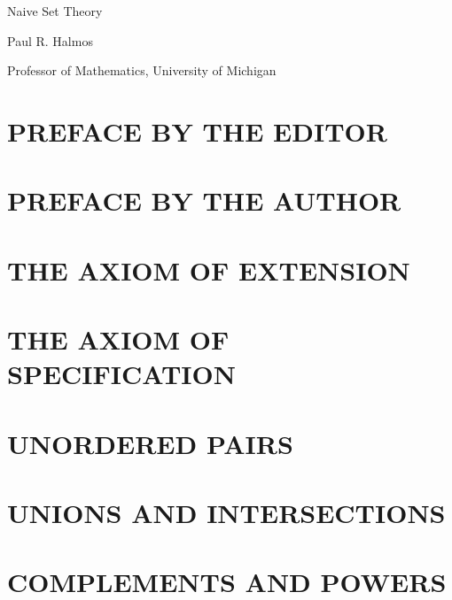 \documentclass[11pt]{book}
\theoremstyle{axiom}
\theoremstyle{exc}
\begin{document}
\begin{titlepage}
 \vspace*{1cm}
 {\huge\raggedright Naive Set Theory\par}
 \noindent\hrulefill\par
 {\LARGE\raggedleft Paul R. Halmos\textsuperscript{\textdagger}\par}
 \vfill
 {\Large\raggedright\textsuperscript{\textdagger}Professor of Mathematics, University of Michigan\par}
\end{titlepage}

\setlength{\headheight}{14.49998pt}

\chapter*{PREFACE BY THE EDITOR} 


\chapter*{PREFACE BY THE AUTHOR} 


\tableofcontents

\chapter{THE AXIOM OF EXTENSION}


\chapter{THE AXIOM OF SPECIFICATION}


\chapter{UNORDERED PAIRS}


\chapter{UNIONS AND INTERSECTIONS}


\chapter{COMPLEMENTS AND POWERS} 

\end{document}
